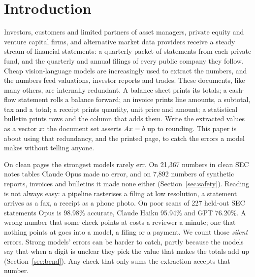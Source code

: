 \documentclass[10pt,twocolumn]{article}
\begin{document}


\section{Introduction}

Investors, customers and limited partners of asset managers, private equity and venture capital firms, and alternative market data providers receive a steady stream of financial statements: a quarterly packet of statements from each private fund, and the quarterly and annual filings of every public company they follow. Cheap vision-language models are increasingly used to extract the numbers, and the numbers feed valuations, investor reports and trades. These documents, like many others, are internally redundant. A balance sheet prints its totals; a cash-flow statement rolls a balance forward; an invoice prints line amounts, a subtotal, tax and a total; a receipt prints quantity, unit price and amount; a statistical bulletin prints rows and the column that adds them. Write the extracted values as a vector $x$: the document set asserts $Ax=b$ up to rounding. This paper is about using that redundancy, and the printed page, to catch the errors a model makes without telling anyone.

On clean pages the strongest models rarely err. On 21,367 numbers in clean SEC notes tables Claude Opus made no error, and on 7,892 numbers of synthetic reports, invoices and bulletins it made none either (Section~\ref{sec:safety}). Reading is not always easy: a pipeline rasterises a filing at low resolution, a statement arrives as a fax, a receipt as a phone photo. On poor scans of 227 held-out SEC statements Opus is 98.98\% accurate, Claude Haiku 95.94\% and GPT 76.20\%. A wrong number that some check points at costs a reviewer a minute; one that nothing points at goes into a model, a filing or a payment. We count those \emph{silent} errors. Strong models' errors can be harder to catch, partly because the models say that when a digit is unclear they pick the value that makes the totals add up (Section~\ref{sec:bend}). Any check that only sums the extraction accepts that number.
\end{document}
